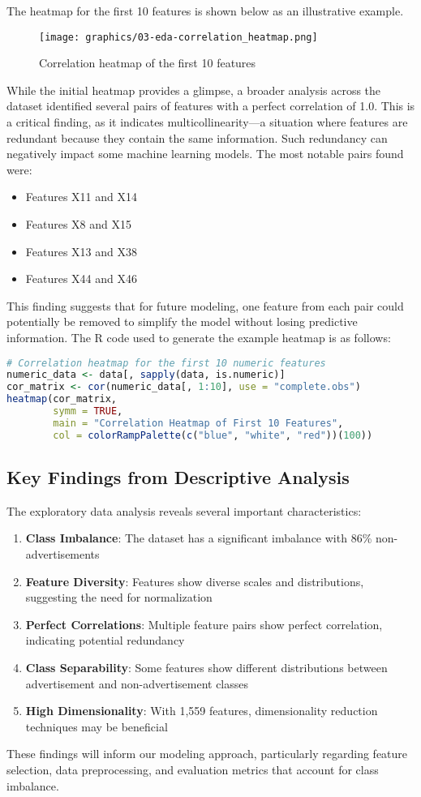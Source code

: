 The heatmap for the first 10 features is shown below as an illustrative example.

\begin{figure}[H]
\centering
\texttt{[image: graphics/03-eda-correlation\_heatmap.png]}
\caption{Correlation heatmap of the first 10 features}
\label{fig:correlation-heatmap}
\end{figure}

While the initial heatmap provides a glimpse, a broader analysis across the dataset identified several pairs of features with a perfect correlation of 1.0. This is a critical finding, as it indicates multicollinearity—a situation where features are redundant because they contain the same information. Such redundancy can negatively impact some machine learning models. The most notable pairs found were:
\begin{itemize}
    \item Features X11 and X14
    \item Features X8 and X15
    \item Features X13 and X38
    \item Features X44 and X46
\end{itemize}

This finding suggests that for future modeling, one feature from each pair could potentially be removed to simplify the model without losing predictive information. The R code used to generate the example heatmap is as follows:

\begin{lstlisting}[language=R]
# Correlation heatmap for the first 10 numeric features
numeric_data <- data[, sapply(data, is.numeric)]
cor_matrix <- cor(numeric_data[, 1:10], use = "complete.obs")
heatmap(cor_matrix, 
        symm = TRUE, 
        main = "Correlation Heatmap of First 10 Features",
        col = colorRampPalette(c("blue", "white", "red"))(100))
\end{lstlisting}

\subsection{Key Findings from Descriptive Analysis}
The exploratory data analysis reveals several important characteristics:

\begin{enumerate}
    \item \textbf{Class Imbalance}: The dataset has a significant imbalance with 86\% non-advertisements
    \item \textbf{Feature Diversity}: Features show diverse scales and distributions, suggesting the need for normalization
    \item \textbf{Perfect Correlations}: Multiple feature pairs show perfect correlation, indicating potential redundancy
    \item \textbf{Class Separability}: Some features show different distributions between advertisement and non-advertisement classes
    \item \textbf{High Dimensionality}: With 1,559 features, dimensionality reduction techniques may be beneficial
\end{enumerate}

These findings will inform our modeling approach, particularly regarding feature selection, data preprocessing, and evaluation metrics that account for class imbalance.